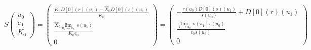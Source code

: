 \documentclass{article}
\begin{document}
\[
  S \left(\begin{array}{c}
  u_{0}\\
  c_{0}\\
  K_{0}
\end{array}\right) = \left(\begin{array}{c}
  \frac{K_{0} D[0]\left(r\right)\left(u_{1}\right) - \hat{X}_{0} D[0]\left(s\right)\left(u_{1}\right)}{K_{0}}\\
  \frac{\hat{X}_{0} \lim_{u_{1} \to u_{0}}\, s\left(u_{1}\right)}{K_{0} c_{0}}\\
  0
\end{array}\right) = \left(\begin{array}{c}
  -\frac{r\left(u_{0}\right) D[0]\left(s\right)\left(u_{1}\right)}{s\left(u_{0}\right)} + D[0]\left(r\right)\left(u_{1}\right)\\
  \frac{\lim_{u_{1} \to u_{0}}\, s\left(u_{1}\right) r\left(u_{0}\right)}{c_{0} s\left(u_{0}\right)}\\
  0
\end{array}\right)
\]
\end{document}
